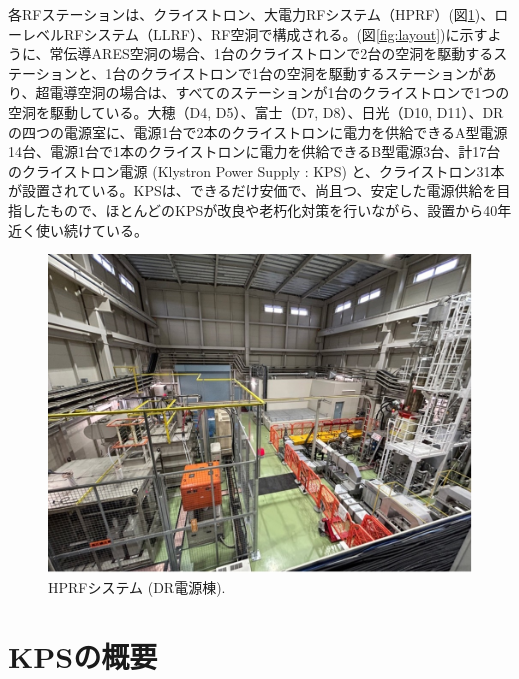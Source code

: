 \documentclass[book,openany]{jlreq}
\theoremstyle{definition}
\begin{document}
各RFステーションは、クライストロン、大電力RFシステム（HPRF）(図\ref{fig:HPRF})、ローレベルRFシステム（LLRF）、RF空洞で構成される。(図\ref{fig:layout})に示すように、常伝導ARES空洞の場合、1台のクライストロンで2台の空洞を駆動するステーションと、1台のクライストロンで1台の空洞を駆動するステーションがあり、超電導空洞の場合は、すべてのステーションが1台のクライストロンで1つの空洞を駆動している。大穂（D4, D5）、富士（D7, D8）、日光（D10, D11）、DRの四つの電源室に、電源1台で2本のクライストロンに電力を供給できるA型電源14台、電源1台で1本のクライストロンに電力を供給できるB型電源3台、計17台のクライストロン電源 (Klystron Power Supply : KPS) と、クライストロン31本が設置されている。KPSは、できるだけ安価で、尚且つ、安定した電源供給を目指したもので、ほとんどのKPSが改良や老朽化対策を行いながら、設置から40年近く使い続けている。
%
\begin{figure}[htbp]
    \begin{center}
        \includegraphics[width=\linewidth]{figs/HPRF.jpg}
        \caption{HPRFシステム (DR電源棟).}
        \label{fig:HPRF}
    \end{center}
\end{figure}

\section{KPSの概要}
\end{document}
